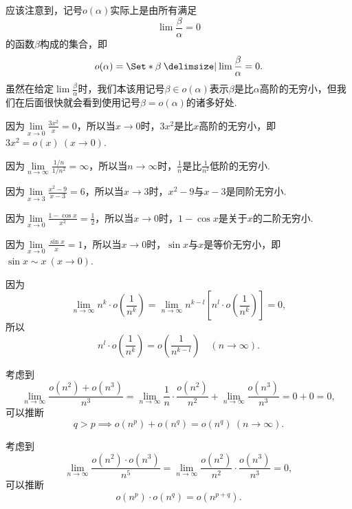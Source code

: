 应该注意到，记号\(o(\alpha)\)实际上是由所有满足\[
\lim \frac{\beta}{\alpha} = 0
\]的函数\(\beta\)构成的集合，即\[
o(\alpha) = \Set*{ \beta \given \lim \frac{\beta}{\alpha} = 0 }.
\]虽然在给定\(\lim \frac{\beta}{\alpha}\)时，我们本该用记号\(\beta \in o(\alpha)\)表示\(\beta\)是比\(\alpha\)高阶的无穷小，但我们在后面很快就会看到使用记号\(\beta = o(\alpha)\)的诸多好处.

\begin{example}
因为\(\lim\limits_{x\to0} \frac{3x^2}{x} = 0\)，所以当\(x\to0\)时，\(3x^2\)是比\(x\)高阶的无穷小，即\(3x^2 = o(x)\ (x\to0)\).

因为\(\lim\limits_{n\to\infty} \frac{1/n}{1/n^2} = \infty\)，所以当\(n\to\infty\)时，\(\frac{1}{n}\)是比\(\frac{1}{n^2}\)低阶的无穷小.

因为\(\lim\limits_{x\to3} \frac{x^2-9}{x-3} = 6\)，所以当\(x\to3\)时，\(x^2-9\)与\(x-3\)是同阶无穷小.

因为\(\lim\limits_{x\to0} \frac{1-\cos x}{x^2} = \frac{1}{2}\)，所以当\(x\to0\)时，\(1-\cos x\)是关于\(x\)的二阶无穷小.

因为\(\lim\limits_{x\to0} \frac{\sin x}{x} = 1\)，所以当\(x\to0\)时，\(\sin x\)与\(x\)是等价无穷小，即\(\sin x \sim x\ (x\to0)\).
\end{example}

\begin{example}
因为\[
\lim\limits_{n\to\infty} n^k \cdot o\left(\frac{1}{n^k}\right)
= \lim\limits_{n\to\infty} n^{k-l} \left[ n^l \cdot o\left(\frac{1}{n^k}\right) \right] = 0,
\]所以\begin{equation}
n^l \cdot o\left(\frac{1}{n^k}\right) = o\left(\frac{1}{n^{k-l}}\right) \quad(n\to\infty).
\end{equation}
\end{example}

\begin{example}
\def\l{\lim\limits_{n\to\infty}}
考虑到\[
\l \frac{o(n^2) + o(n^3)}{n^3}
= \l \frac{1}{n}\cdot\frac{o(n^2)}{n^2} + \l \frac{o(n^3)}{n^3}
= 0 + 0 = 0,
\]可以推断\[
q > p \implies o(n^p) + o(n^q) = o(n^q)\ (n\to\infty).
\]

考虑到\[
\l \frac{o(n^2) \cdot o(n^3)}{n^5}
= \l \frac{o(n^2)}{n^2}\cdot\frac{o(n^3)}{n^3}
= 0,
\]可以推断\begin{equation}
o(n^p) \cdot o(n^q) = o(n^{p+q}).
\end{equation}
\end{example}

